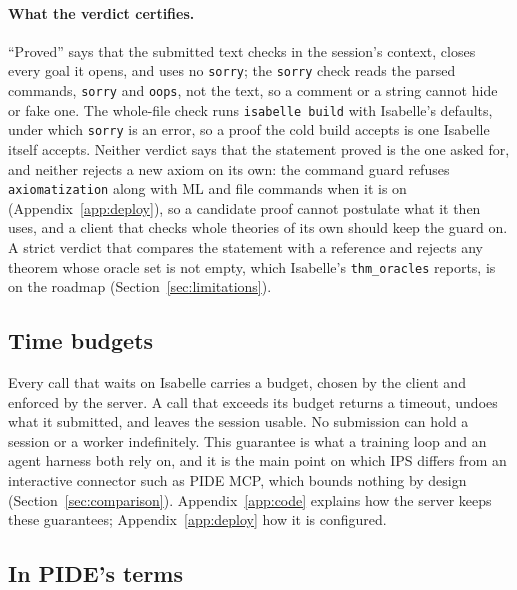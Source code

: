 \documentclass[11pt]{article}
\newcommand{\code}[1]{\colorbox{gray!12}{\texttt{\vphantom{Ag}#1}}}
\begin{document}
\paragraph{What the verdict certifies.} ``Proved'' says that the submitted
text checks in the session's context, closes every goal it opens, and
uses no \code{sorry}; the \code{sorry} check reads the parsed commands,
\code{sorry} and \code{oops}, not the text, so a comment or a string
cannot hide or fake one. The whole-file check runs \code{isabelle build}
with Isabelle's defaults, under which \code{sorry} is an error, so a
proof the cold build accepts is one Isabelle itself accepts. Neither
verdict says that the statement proved is the one asked for, and neither
rejects a new axiom on its own: the command guard refuses
\code{axiomatization} along with ML and file commands when it is on
(Appendix~\ref{app:deploy}), so a candidate proof cannot postulate what it
then uses, and a client that checks whole theories of its own should keep
the guard on. A strict verdict that compares the statement with a
reference and rejects any theorem whose oracle set is not empty, which
Isabelle's \code{thm\_oracles} reports, is on the roadmap
(Section~\ref{sec:limitations}).

\subsection{Time budgets}

Every call that waits on Isabelle carries a budget, chosen by the client
and enforced by the server. A call that exceeds its budget returns a
timeout, undoes what it submitted, and leaves the session usable. No
submission can hold a session or a worker indefinitely. This guarantee is
what a training loop and an agent harness both rely on, and it is the
main point on which IPS differs from an interactive connector such as
PIDE MCP, which bounds nothing by design (Section~\ref{sec:comparison}).
Appendix~\ref{app:code} explains how the server keeps these guarantees;
Appendix~\ref{app:deploy} how it is configured.

\subsection{In PIDE's terms}
\label{sec:pide-terms}
\end{document}
